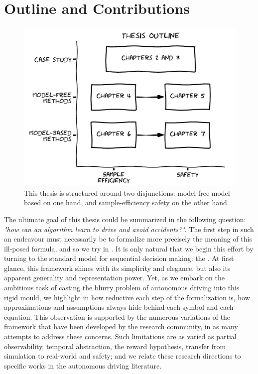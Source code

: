 \section{Outline and Contributions}

\begin{figure}[ht]
	\includegraphics[width=0.9\linewidth]{img/outline}
	\caption{This thesis is structured around two disjunctions: \gls{model-free} \vs \gls{model-based} on one hand, and sample-efficiency \vs safety on the other hand.}
	\label{fig:thesis-outline}
\end{figure}

The ultimate goal of this thesis could be summarized in the following question: \emph{"how can an algorithm learn to drive and avoid accidents?"}. The first step in such an endeavour must necessarily be to formalize more precisely the meaning of this ill-posed formula, and so we try in \textbf{}.
It is only natural that we begin this effort by turning to the standard model for sequential decision making: the . At first glance, this framework shines with its simplicity and elegance, but also its apparent generality and representation power. Yet, as we embark on the ambitious task of casting the blurry problem of autonomous driving into this rigid mould, we highlight in \textbf{} how reductive each step of the formalization is, how approximations and assumptions always hide behind each symbol and each equation. This observation is supported by the numerous variations of the framework that have been developed by the research community, in as many attempts to address these concerns. Such limitations are as varied as partial observability, temporal abstraction, the reward hypothesis, transfer from simulation to real-world and safety; and we relate these research directions to specific works in the autonomous driving literature.

